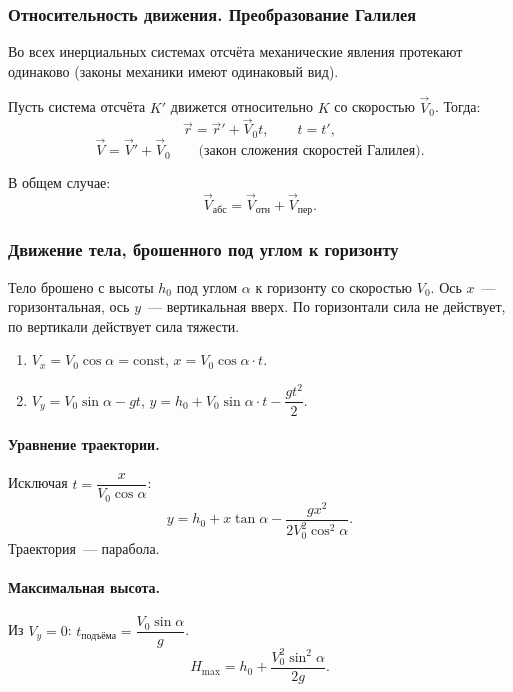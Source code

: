 \documentclass[12pt]{article}
\begin{document}
\subsubsection{Относительность движения. Преобразование Галилея}

\begin{definition}
	Во всех инерциальных системах отсчёта механические явления протекают одинаково (законы механики имеют одинаковый вид).
\end{definition}

Пусть система отсчёта $K'$ движется относительно $K$ со скоростью $\vec{V}_0$. Тогда:
\[
	\vec{r} = \vec{r}' + \vec{V}_0 t, \qquad t = t',
\]
\[
	\vec{V} = \vec{V}' + \vec{V}_0 \qquad \text{(закон сложения скоростей Галилея)}.
\]

В общем случае:
\[
	\vec{V}_{\text{абс}} = \vec{V}_{\text{отн}} + \vec{V}_{\text{пер}}.
\]

\subsubsection{Движение тела, брошенного под углом к горизонту}

Тело брошено с высоты $h_0$ под углом $\alpha$ к горизонту со скоростью $V_0$. Ось $x$~--- горизонтальная, ось $y$~--- вертикальная вверх. По горизонтали сила не действует, по вертикали действует сила тяжести.

\begin{enumerate}
	\item $V_x = V_0 \cos\alpha = \mathrm{const}$, \quad $x = V_0 \cos\alpha \cdot t$.
	\item $V_y = V_0 \sin\alpha - g t$, \quad $y = h_0 + V_0 \sin\alpha \cdot t - \dfrac{g t^2}{2}$.
\end{enumerate}

\paragraph{Уравнение траектории.}
Исключая $t = \dfrac{x}{V_0 \cos\alpha}$:
\[
	y = h_0 + x \tan\alpha - \frac{g x^2}{2 V_0^2 \cos^2\alpha}.
\]
Траектория~--- парабола.

\paragraph{Максимальная высота.} Из $V_y = 0$: $t_{\text{подъёма}} = \dfrac{V_0 \sin\alpha}{g}$.
\[
	H_{\max} = h_0 + \frac{V_0^2 \sin^2\alpha}{2g}.
\]
\end{document}
